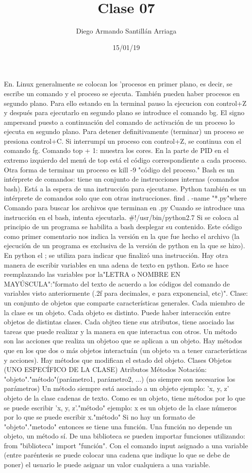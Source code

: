 \documentclass[letterpaper, 12pt, oneside]{article}%
\title{\Huge Clase 07}
\author{Diego Armando Santillán Arriaga}
\date{15/01/19}
\begin{document}
	\maketitle
	\newpage
	En. Linux generalmente se colocan los 'procesos en primer plano, es decir, se escribe un comando y el proceso se ejecuta. También pueden haber procesos en segundo plano. Para ello estando en la terminal pauso la ejecucion con control+Z y después para ejecutarlo en segundo plano se introduce el comando bg. 
	El signo ampersand puesto a continuación del comando de activación de un proceso lo ejecuta en segundo plano.
	Para detener definitivamente (terminar) un proceso se presiona control+C.
	Si interrumpí un proceso con control+Z, se continua con el comando fg. 
	Comando top + 1: muestra los cores. En la parte de PID en el extremo izquierdo del menú de top está el código correspondiente a cada proceso. 
	Otra forma de terminar un proceso es kill -9 "código del proceso."
	Bash es un intérprete de comandos: tiene un conjunto de instrucciones internas (comandos bash). Está a la espera de una instrucción para ejecutarse. Python también es un intérprete de comandos solo que con otras instrucciones.
	find . -name "*.py"where Comando para buscar los archivos que terminan en .py
	Cuando se introduce una instrucción en el bash, intenta ejecutarla.
	#!/usr/bin/python2.7 Si se coloca al principio de un programa se habilita a bash desplegar su contenido. Este código como primer comentario nos indica la versión en la que fue hecho el archivo (la ejecución de un programa es exclusiva de la versión de python en la que se hizo).
	En python el ; se utiliza para indicar que finalizó una instrucción. 
	Hay otra manera de escribir variables en una adena de texto en python. Esto se hace reemplazando las variables por la"LETRA o NOMBRE EN MAYÚSCULA":"formato del texto de acuerdo a los códigos del comando de variables visto anteriormente (.2f para decimales, e para exponencial, etc)".
	Clase: un conjunto de objetos que comparte características generales. Cada miembro de la clase es un objeto. Cada objeto es distinto. Puede haber interacción entre objetos de distintas clases. Cada objteo tiene sus atributos, tiene asociado las tareas que puede realizar y la manera en que interactua con otros. Un método son las acciones que realiza un objetoo que se aplican a un objeto. Hay métodos que en los que dos o más objetos interactuán (un objeto va a tener características y acciones). Hay métodos que modifican el estado del objeto. 
	Clases 
	Objetos (UNO ESPECÍFICO DE LA CLASE)
	Atributos
	Métodos
	Notación: "objeto"."método"(parámetro1, parámetro2, ...) (no siempre son necesarios los parámetros)
	Un método siempre está asociado a un objeto 
	ejemplo:
	'x, y, z' objeto de la clase cadenas de texto. Como es un objeto, tiene métodos por lo que se puede escribir 'x, y, z'."método"
	ejemplo:
	x es un objeto de la clase números por lo que se puede escribir x."método"
	Si no hay un formato de "objeto"."metodo" entonces se tiene una función. Una función no depende un objeto, un método sí. 
	De una biblioteca se pueden importar funciones utilizando: from "biblioteca" import "función".
	Con el comando input asignado a una variable (entre paréntesis se puede colocar una cadena que indique lo que se debe de poner) el usuario le puede asignar un valor cualquiera a una variable.
	
\end{document}
